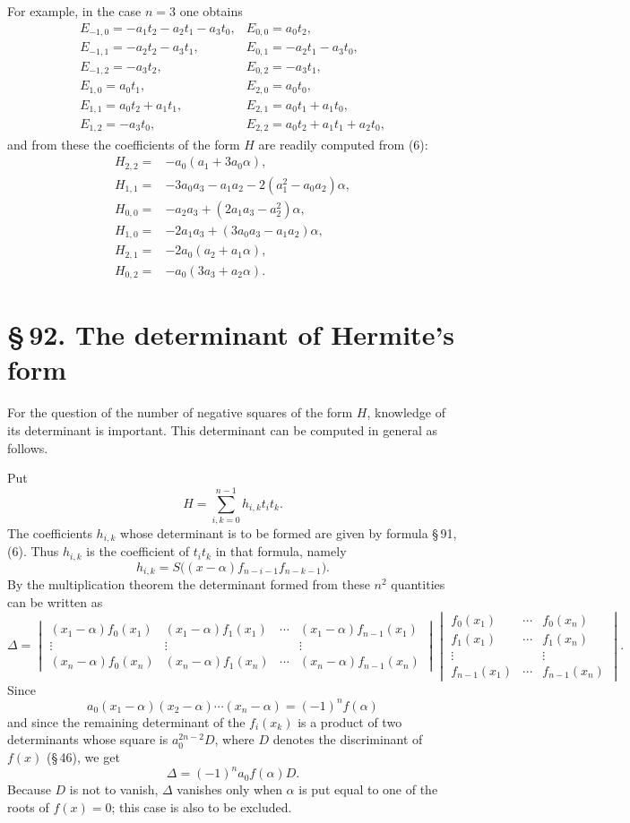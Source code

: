 \documentclass[11pt]{article}
\providecommand{\sect}[2]{\section*{\S\,#1. #2}}
\begin{document}
For example, in the case $n=3$ one obtains
\[
\begin{array}{lll}
E_{-1,0}=-a_1t_2-a_2t_1-a_3t_0, & E_{0,0}=a_0t_2,\\
E_{-1,1}=-a_2t_2-a_3t_1,        & E_{0,1}=-a_2t_1-a_3t_0,\\
E_{-1,2}=-a_3t_2,                & E_{0,2}=-a_3t_1,\\
E_{1,0}=a_0t_1,                  & E_{2,0}=a_0t_0,\\
E_{1,1}=a_0t_2+a_1t_1,           & E_{2,1}=a_0t_1+a_1t_0,\\
E_{1,2}=-a_3t_0,                 & E_{2,2}=a_0t_2+a_1t_1+a_2t_0,
\end{array}
\]
and from these the coefficients of the form $H$ are readily computed from (6):
\[
\begin{array}{rl}
H_{2,2}={}&-a_0(a_1+3a_0\alpha),\\
H_{1,1}={}&-3a_0a_3-a_1a_2-2(a_1^2-a_0a_2)\alpha,\\
H_{0,0}={}&-a_2a_3+(2a_1a_3-a_2^2)\alpha,\\
H_{1,0}={}&-2a_1a_3+(3a_0a_3-a_1a_2)\alpha,\\
H_{2,1}={}&-2a_0(a_2+a_1\alpha),\\
H_{0,2}={}&-a_0(3a_3+a_2\alpha).
\end{array}
\]

\sect{92}{The determinant of Hermite's form}

For the question of the number of negative squares of the form $H$, knowledge of its determinant is important. This determinant can be computed in general as follows.

Put
\[
        H=\sum_{i,k=0}^{n-1}h_{i,k}t_i t_k.
\]
The coefficients $h_{i,k}$ whose determinant is to be formed are given by formula \S\,91, (6). Thus $h_{i,k}$ is the coefficient of $t_it_k$ in that formula, namely
\[
        h_{i,k}=S\bigl((x-\alpha)f_{n-i-1}f_{n-k-1}\bigr).
\]
By the multiplication theorem the determinant formed from these $n^2$ quantities can be written as
\[
\Delta=\begin{vmatrix}
(x_1-\alpha)f_0(x_1)&(x_1-\alpha)f_1(x_1)&\cdots&(x_1-\alpha)f_{n-1}(x_1)\\
\vdots&\vdots&&\vdots\\
(x_n-\alpha)f_0(x_n)&(x_n-\alpha)f_1(x_n)&\cdots&(x_n-\alpha)f_{n-1}(x_n)
\end{vmatrix}
\begin{vmatrix}
f_0(x_1)&\cdots&f_0(x_n)\\
f_1(x_1)&\cdots&f_1(x_n)\\
\vdots&&\vdots\\
f_{n-1}(x_1)&\cdots&f_{n-1}(x_n)
\end{vmatrix}.
\]
Since
\[
        a_0(x_1-\alpha)(x_2-\alpha)\cdots(x_n-\alpha)=(-1)^nf(\alpha)
\]
and since the remaining determinant of the $f_i(x_k)$ is a product of two determinants whose square is $a_0^{2n-2}D$, where $D$ denotes the discriminant of $f(x)$ (\S\,46), we get
\begin{equation}
        \Delta=(-1)^n a_0 f(\alpha)D.
\tag{1}
\end{equation}
Because $D$ is not to vanish, $\Delta$ vanishes only when $\alpha$ is put equal to one of the roots of $f(x)=0$; this case is also to be excluded.
\end{document}
